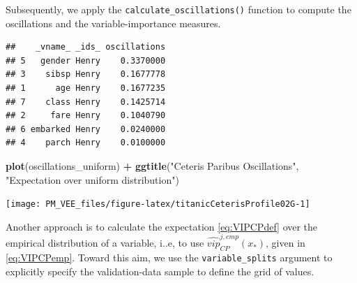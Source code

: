 \documentclass[12pt,]{krantz}
\newenvironment{Shaded}{\begin{snugshade}}{\end{snugshade}}
\newcommand{\DataTypeTok}[1]{\textcolor[rgb]{0.13,0.29,0.53}{#1}}
\newcommand{\KeywordTok}[1]{\textcolor[rgb]{0.13,0.29,0.53}{\textbf{#1}}}
\newcommand{\NormalTok}[1]{#1}
\newcommand{\OperatorTok}[1]{\textcolor[rgb]{0.81,0.36,0.00}{\textbf{#1}}}
\newcommand{\StringTok}[1]{\textcolor[rgb]{0.31,0.60,0.02}{#1}}
\theoremstyle{definition}
\theoremstyle{definition}
\theoremstyle{definition}
\theoremstyle{remark}
\begin{document}
Subsequently, we apply the \texttt{calculate\_oscillations()} function
to compute the oscillations and the variable-importance measures.

\begin{Shaded}
\end{Shaded}

\begin{verbatim}
##    _vname_ _ids_ oscillations
## 5   gender Henry    0.3370000
## 3    sibsp Henry    0.1677778
## 1      age Henry    0.1677235
## 7    class Henry    0.1425714
## 2     fare Henry    0.1040790
## 6 embarked Henry    0.0240000
## 4    parch Henry    0.0100000
\end{verbatim}

\begin{Shaded}
\begin{Highlighting}[]
\KeywordTok{plot}\NormalTok{(oscillations_uniform) }\OperatorTok{+}\StringTok{ }\KeywordTok{ggtitle}\NormalTok{(}\StringTok{"Ceteris Paribus Oscillations"}\NormalTok{, }\StringTok{"Expectation over uniform distribution"}\NormalTok{)}
\end{Highlighting}
\end{Shaded}

\begin{center}\texttt{[image: PM\_VEE\_files/figure-latex/titanicCeterisProfile02G-1]} \end{center}

Another approach is to calculate the expectation \eqref{eq:VIPCPdef} over
the empirical distribution of a variable, i..e, to use
\(\widehat{vip}_{CP}^{j,emp}(x_*)\), given in \eqref{eq:VIPCPemp}. Toward
this aim, we use the \texttt{variable\_splits} argument to explicitly
specify the validation-data sample to define the grid of values.
\end{document}
